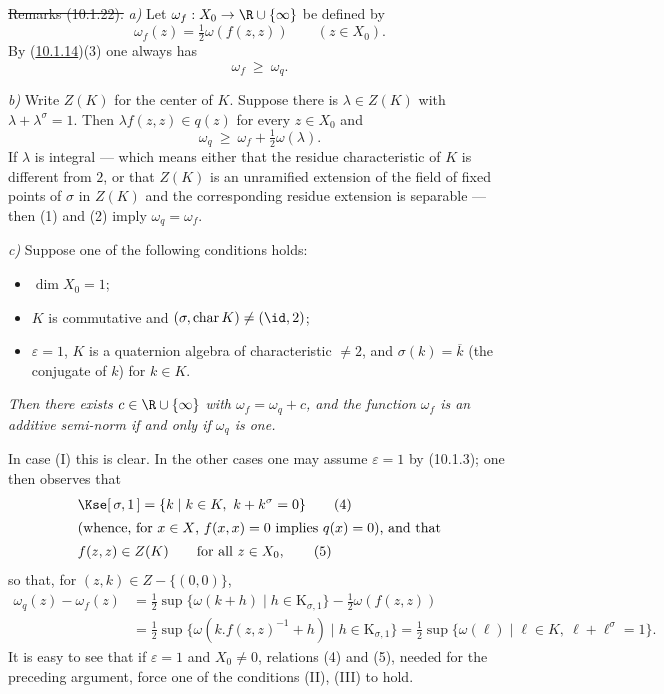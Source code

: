 \documentclass[12pt,a4paper,oneside,english]{smfart}
\newcommand{\btref}[1]{\hyperlink{bt:#1}{#1}}
\theoremstyle{definition}
\theoremstyle{bt}
\begin{document}
\st{Remarks (10.1.22).}
\emph{a)} Let $\omega_f:X_0\to\R\cup\{\infty\}$ be defined by
\[
\omega_f(z)=\tfrac12\omega(f(z,z))\qquad (z\in X_0).
\]
By (\btref{10.1.14})(3) one always has
\begin{equation}
\omega_f\ \ge\ \omega_q. \tag{1}
\end{equation}

\emph{b)} Write $Z(K)$ for the center of $K$. Suppose there is $\lambda\in Z(K)$
with $\lambda+\lambda^{\sigma}=1$. Then $\lambda f(z,z)\in q(z)$ for every
$z\in X_0$ and
\begin{equation}
\omega_q\ \ge\ \omega_f+\tfrac12\omega(\lambda). \tag{2}
\end{equation}
If $\lambda$ is integral --- which means either that the residue characteristic
of $K$ is different from $2$, or that $Z(K)$ is an unramified extension of the
field of fixed points of $\sigma$ in $Z(K)$ and the corresponding residue
extension is separable --- then (1) and (2) imply $\omega_q=\omega_f$.

\emph{c)} Suppose one of the following conditions holds:
\begin{itemize}
\item[(I)] $\dim X_0=1$;
\item[(II)] $K$ is commutative and $(\sigma,\operatorname{char}K)\neq(\id,2)$;
\item[(III)] $\varepsilon=1$, $K$ is a quaternion algebra of characteristic
$\neq2$, and $\sigma(k)=\overline k$ (the conjugate of $k$) for $k\in K$.
\end{itemize}
\emph{Then there exists $c\in\R\cup\{\infty\}$ with $\omega_f=\omega_q+c$, and
the function $\omega_f$ is an additive semi-norm if and only if $\omega_q$ is
one.}

In case (I) this is clear. In the other cases one may assume $\varepsilon=1$ by
(10.1.3); one then observes that
\begin{align}
&\Kse[\,\sigma,1\,]=\{k\mid k\in K,\ k+k^{\sigma}=0\} \tag{4}\\
\intertext{(whence, for $x\in X$, $f(x,x)=0$ implies $q(x)=0$), and that}
&f(z,z)\in Z(K)\qquad\text{for all } z\in X_0, \tag{5}
\end{align}
so that, for $(z,k)\in Z-\{(0,0)\}$,
\begin{align*}
\omega_q(z)-\omega_f(z)
&=\tfrac12\sup\{\omega(k+h)\mid h\in\mathrm{K}_{\sigma,1}\}
 -\tfrac12\omega(f(z,z))\\
&=\tfrac12\sup\{\omega(k.f(z,z)^{-1}+h)\mid h\in\mathrm{K}_{\sigma,1}\}
 =\tfrac12\sup\{\omega(\ell)\mid \ell\in K,\ \ell+\ell^{\sigma}=1\}.
\end{align*}
It is easy to see that if $\varepsilon=1$ and $X_0\neq0$, relations (4) and (5),
needed for the preceding argument, force one of the conditions (II), (III) to
hold.
\end{document}
